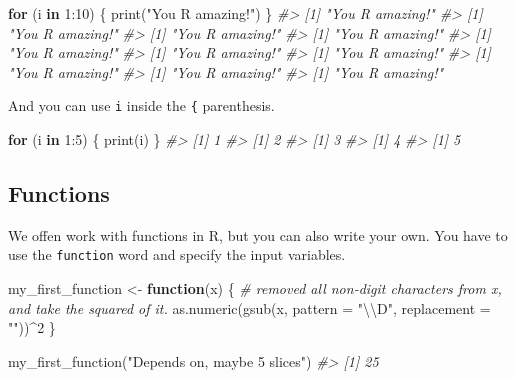 \documentclass[
]{article}
\newenvironment{Shaded}{\begin{snugshade}}{\end{snugshade}}
\newcommand{\AttributeTok}[1]{\textcolor[rgb]{0.77,0.63,0.00}{#1}}
\newcommand{\CommentTok}[1]{\textcolor[rgb]{0.56,0.35,0.01}{\textit{#1}}}
\newcommand{\ControlFlowTok}[1]{\textcolor[rgb]{0.13,0.29,0.53}{\textbf{#1}}}
\newcommand{\DecValTok}[1]{\textcolor[rgb]{0.00,0.00,0.81}{#1}}
\newcommand{\FunctionTok}[1]{\textcolor[rgb]{0.00,0.00,0.00}{#1}}
\newcommand{\NormalTok}[1]{#1}
\newcommand{\OtherTok}[1]{\textcolor[rgb]{0.56,0.35,0.01}{#1}}
\newcommand{\SpecialCharTok}[1]{\textcolor[rgb]{0.00,0.00,0.00}{#1}}
\newcommand{\StringTok}[1]{\textcolor[rgb]{0.31,0.60,0.02}{#1}}
\begin{document}
\begin{Shaded}
\begin{Highlighting}[]
\ControlFlowTok{for}\NormalTok{ (i }\ControlFlowTok{in} \DecValTok{1}\SpecialCharTok{:}\DecValTok{10}\NormalTok{) \{}
  \FunctionTok{print}\NormalTok{(}\StringTok{"You R amazing!"}\NormalTok{)}
\NormalTok{\}}
\CommentTok{\#\textgreater{} [1] "You R amazing!"}
\CommentTok{\#\textgreater{} [1] "You R amazing!"}
\CommentTok{\#\textgreater{} [1] "You R amazing!"}
\CommentTok{\#\textgreater{} [1] "You R amazing!"}
\CommentTok{\#\textgreater{} [1] "You R amazing!"}
\CommentTok{\#\textgreater{} [1] "You R amazing!"}
\CommentTok{\#\textgreater{} [1] "You R amazing!"}
\CommentTok{\#\textgreater{} [1] "You R amazing!"}
\CommentTok{\#\textgreater{} [1] "You R amazing!"}
\CommentTok{\#\textgreater{} [1] "You R amazing!"}
\end{Highlighting}
\end{Shaded}

And you can use \texttt{i} inside the \texttt{\{} parenthesis.

\begin{Shaded}
\begin{Highlighting}[]
\ControlFlowTok{for}\NormalTok{ (i }\ControlFlowTok{in} \DecValTok{1}\SpecialCharTok{:}\DecValTok{5}\NormalTok{) \{}
  \FunctionTok{print}\NormalTok{(i)}
\NormalTok{\}}
\CommentTok{\#\textgreater{} [1] 1}
\CommentTok{\#\textgreater{} [1] 2}
\CommentTok{\#\textgreater{} [1] 3}
\CommentTok{\#\textgreater{} [1] 4}
\CommentTok{\#\textgreater{} [1] 5}
\end{Highlighting}
\end{Shaded}

\hypertarget{functions}{%
\subsection{Functions}\label{functions}}

We offen work with functions in R, but you can also write your own. You have to use the \texttt{function} word and specify the input variables.

\begin{Shaded}
\begin{Highlighting}[]
\NormalTok{my\_first\_function }\OtherTok{\textless{}{-}} \ControlFlowTok{function}\NormalTok{(x) \{}
  \CommentTok{\# removed all non{-}digit characters from x, and take the squared of it.}
  \FunctionTok{as.numeric}\NormalTok{(}\FunctionTok{gsub}\NormalTok{(x, }\AttributeTok{pattern =} \StringTok{"}\SpecialCharTok{\textbackslash{}\textbackslash{}}\StringTok{D"}\NormalTok{, }\AttributeTok{replacement =} \StringTok{""}\NormalTok{))}\SpecialCharTok{\^{}}\DecValTok{2}
\NormalTok{\}}

\FunctionTok{my\_first\_function}\NormalTok{(}\StringTok{"Depends on, maybe 5 slices"}\NormalTok{)}
\CommentTok{\#\textgreater{} [1] 25}
\end{Highlighting}
\end{Shaded}
\end{document}
